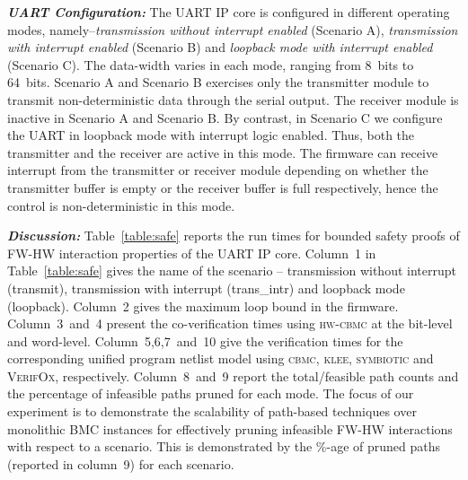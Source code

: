 \documentclass[sigconf]{acmart}
\newcommand{\tool}[1]{\textsc{#1}\xspace}
\newcommand{\cbmcv}{\tool{cbmc}}
\newcommand{\hwcbmcv}{\tool{hw-cbmc}}
\newcommand{\verifox}{\tool{VerifOx}}
\newcommand{\klee}{\tool{klee}}
\begin{document}
\textbf{\emph{UART Configuration:}} The UART IP core is configured in
different operating modes, namely--{\em transmission without interrupt
enabled} (Scenario A), {\em transmission with interrupt enabled} (Scenario
B) and {\em loopback mode with interrupt enabled} (Scenario C).  The
data-width varies in each mode, ranging from 8~bits to 64~bits.  Scenario A
and Scenario B exercises only the transmitter module to transmit
non-deterministic data through the serial output.  The receiver module is
inactive in Scenario A and Scenario B.  By contrast, in Scenario C we
configure the UART in loopback mode with interrupt logic enabled.  Thus,
both the transmitter and the receiver are active in this mode.  The firmware
can receive interrupt from the transmitter or receiver module depending on
whether the transmitter buffer is empty or the receiver buffer is full
respectively, hence the control is non-deterministic in this mode.

\textbf{\emph{Discussion:}}
Table~\ref{table:safe} reports the run times for bounded safety proofs of
FW-HW interaction properties of the UART IP core.  Column~1 in
Table~\ref{table:safe} gives the name of the scenario -- transmission
without interrupt (transmit), transmission with interrupt (trans\_intr) and
loopback mode (loopback).  Column~2 gives the maximum loop bound in the
firmware.  Column~3~and~4 present the co-verification times using \hwcbmcv
at the bit-level and word-level.  Column~5,6,7~and~10 give the verification
times for the corresponding unified program netlist model using \cbmcv,
\klee, \textsc{symbiotic} and \verifox, respectively.  Column~8~and~9 report
the total/feasible path counts and the percentage of infeasible paths pruned
for each mode.  The focus of our experiment is to demonstrate the
scalability of path-based techniques over monolithic BMC instances for
effectively pruning infeasible FW-HW interactions with respect to a
scenario.  This is demonstrated by the \%-age of pruned paths (reported in
column~9) for each scenario.
\end{document}
